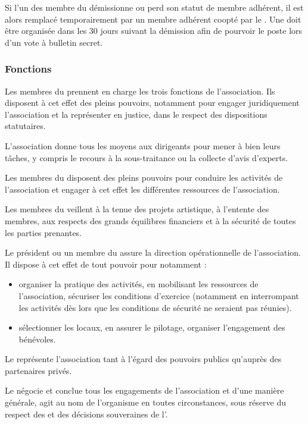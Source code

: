 \documentclass[a4paper,french,10pt]{article}
\begin{document}
Si l'un des membre du \bureau{} démissionne ou perd son statut de membre adhérent, il est alors remplacé temporairement par un membre adhérent coopté par le \bureau{}. Une \AGE{} doit être organisée dans les 30 jours suivant la démission afin de pourvoir le poste lors d'un vote à bulletin secret.

\subsubsection{Fonctions}
\label{sec:fonctions}

Les membres du \bureau{} prennent en charge les trois fonctions de
l’association.  Ils disposent à cet effet des pleins pouvoirs,
notamment pour engager juridiquement l’association et la représenter
en justice, dans le respect des dispositions statutaires.

L’association donne tous les moyens aux dirigeants pour mener à bien
leurs tâches, y compris le recours à la sous-traitance ou la collecte
d’avis d’experts.

Les membres du \bureau{} disposent des pleins pouvoirs pour conduire les
activités de l’association et engager à cet effet les différentes
ressources de l’association.

Les membres du \bureau{} veillent à la tenue des projets artistique, à
l'entente des membres, aux respects des grands équilibres financiers
et à la sécurité de toutes les parties prenantes.  


Le président ou un membre du \bureau{} assure la direction opérationnelle de
l’association. Il dispose à cet effet de tout pouvoir pour notamment :
\begin{itemize}
\item organiser la pratique des activités, en mobilisant les
  ressources de l’association, sécuriser les conditions d’exercice
  (notamment en interrompant les activités dès lors que les conditions
  de sécurité ne seraient pas réunies).
\item sélectionner les locaux, en assurer le pilotage, organiser
  l’engagement des bénévoles.
\end{itemize}

Le \bureau{} représente l’association tant à l’égard des pouvoirs
publics qu’auprès des partenaires privés.

Le \bureau{} négocie et conclue tous les engagements de l’association et
d’une manière générale, agit au nom de l’organisme en toutes
circonstances, sous réserve du respect des \statuts{} et des décisions
souveraines de l’\AG{}.
\end{document}
